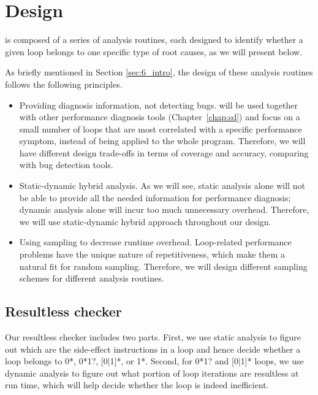 \section{\Tool Design}
\label{sec:6_design}
\Tool is composed of a series of analysis routines, each designed to 
identify whether a given loop belongs to one specific type of root causes,
as we will present below. 

As briefly mentioned in Section \ref{sec:6_intro}, the design of these analysis routines follows the following principles.
\begin{itemize}
\item Providing diagnosis information, not detecting bugs. \Tool will be  
used together with other performance diagnosis tools (Chapter~\ref{chap:sd})
and focus on a small
number of loops that are most correlated with a specific performance symptom,
instead of being applied to the whole program. Therefore, we will have different
design trade-offs in terms of coverage and accuracy, comparing with 
bug detection tools.

\item Static-dynamic hybrid analysis. As we will see, static analysis alone
will not be able to provide all the needed information for performance
diagnosis; dynamic analysis alone will incur too much unnecessary overhead.
Therefore, we will use static-dynamic hybrid approach throughout our design.

\item Using sampling to decrease runtime overhead. Loop-related 
performance problems have the unique nature of repetitiveness, which make 
them a natural fit for random sampling. Therefore, we will design different
sampling schemes for different analysis routines.
\end{itemize}

\subsection{Resultless checker}
\label{sec:6_workless}

Our resultless checker includes two parts. First, we use static analysis
to figure out which are the side-effect instructions in a loop and hence
decide whether a loop belongs to 0*, 0*1?, [0$|$1]*, or 1*. Second, for
0*1? and [0$|$1]* loops, we use
dynamic analysis to figure out what portion of loop iterations are
resultless at run time, which will help decide whether the loop is indeed
inefficient.


